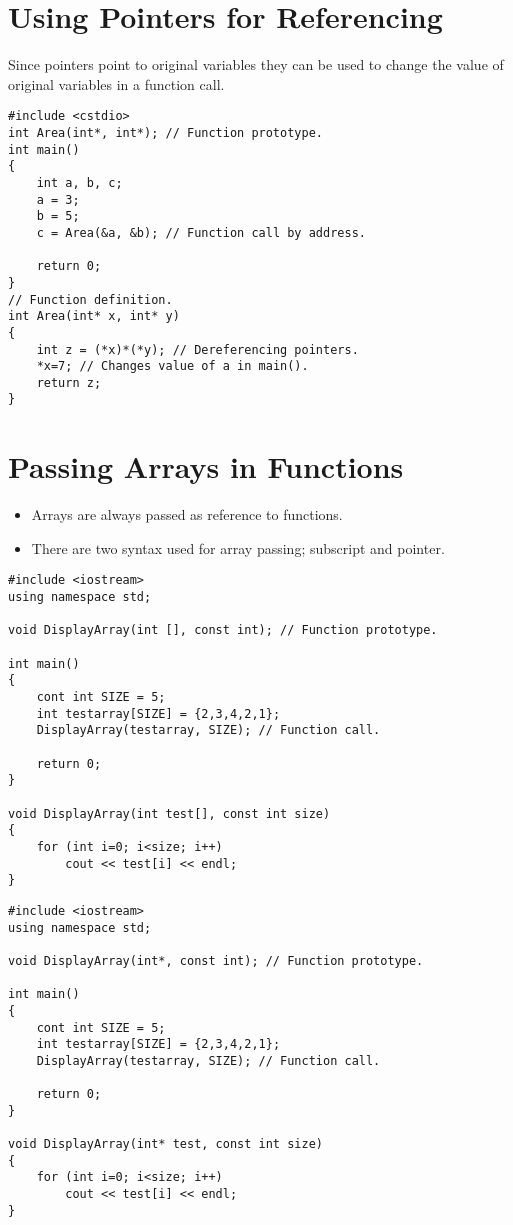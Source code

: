 \documentclass[12pt,a4paper]{article}
\begin{document}
\section{Using Pointers for Referencing}
Since pointers point to original variables they can be used to change the value of original variables in a function call.
\begin{lstlisting}[caption={Pointers as Arguments}]
#include <cstdio>
int Area(int*, int*); // Function prototype.
int main()
{
	int a, b, c;
	a = 3;
	b = 5;
	c = Area(&a, &b); // Function call by address.
	
	return 0;
}
// Function definition.
int Area(int* x, int* y)
{
	int z = (*x)*(*y); // Dereferencing pointers.
	*x=7; // Changes value of a in main().
	return z;
}
\end{lstlisting}
\section{Passing Arrays in Functions}
\begin{itemize}
\item Arrays are always passed as reference to functions.
\item There are two syntax used for array passing; subscript and pointer.
\end{itemize}
\begin{lstlisting}[caption={Passing Array Using Subscript Notation}]
#include <iostream>
using namespace std;

void DisplayArray(int [], const int); // Function prototype.

int main()
{
	cont int SIZE = 5;
	int testarray[SIZE] = {2,3,4,2,1};
	DisplayArray(testarray, SIZE); // Function call.
	
	return 0;
}

void DisplayArray(int test[], const int size)
{
	for (int i=0; i<size; i++)
		cout << test[i] << endl;
}
\end{lstlisting}
\begin{lstlisting}[caption={Passing Array Using Pointer Notation}]
#include <iostream>
using namespace std;

void DisplayArray(int*, const int); // Function prototype.

int main()
{
	cont int SIZE = 5;
	int testarray[SIZE] = {2,3,4,2,1};
	DisplayArray(testarray, SIZE); // Function call.
	
	return 0;
}

void DisplayArray(int* test, const int size)
{
	for (int i=0; i<size; i++)
		cout << test[i] << endl;
}
\end{lstlisting}
\end{document}

